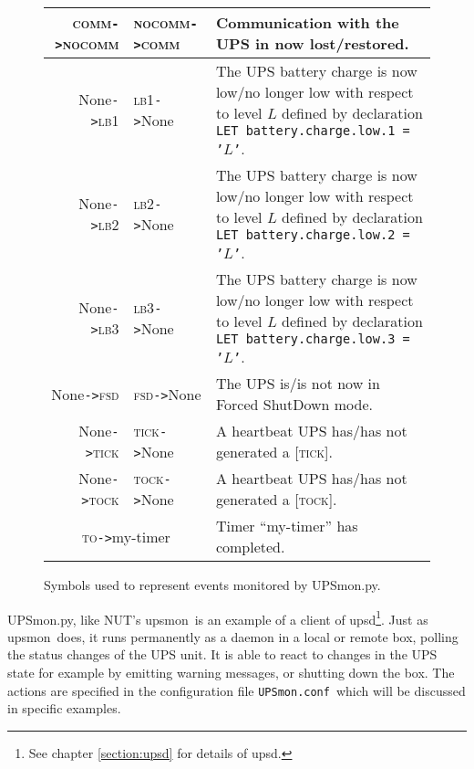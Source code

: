 \documentclass[12pt]{article}
\newcommand{\upsd}{\mbox{\textcolor{UPSDCOLOUR}{upsd}}}
\newcommand{\upsmon}{\mbox{\textcolor{MONCOLOUR}{upsmon}}}
\newcommand{\UPSmon}{\mbox{\textcolor{UPSMONCOLOUR}{UPSmon.py}}}
\newcommand{\LBi}{\textcolor{MONCOLOUR}{\textsc{lb1}}}
\newcommand{\LBii}{\textcolor{MONCOLOUR}{\textsc{lb2}}}
\newcommand{\LBiii}{\textcolor{MONCOLOUR}{\textsc{lb3}}}
\newcommand{\NOCOMM}{\textcolor{MONCOLOUR}{\textsc{nocomm}}}
\newcommand{\FSD}{\textcolor{UPSMONCOLOUR}{\textsc{fsd}}}
\newcommand{\COMM}{\textcolor{UPSMONCOLOUR}{\textsc{comm}}}
\newcommand{\None}{\textcolor{UPSMONCOLOUR}{\textsf{None}}}
\newcommand{\TICK}{\textcolor{UPSMONCOLOUR}{\textsc{tick}}}
\newcommand{\TO}{\textcolor{UPSMONCOLOUR}{\textsc{to}}}
\newcommand{\TOCK}{\textcolor{UPSMONCOLOUR}{\textsc{tock}}}
\newcommand{\status}[1]{\textcolor{UPSDCOLOUR}{[{#1}]}}
\newcommand{\EVENT}[2]{\textcolor{MONCOLOUR}{#1}{\allowbreak}\texttt{\textcolor{MONCOLOUR}{->}}{\allowbreak}\textcolor{MONCOLOUR}{#2}}
\newcommand{\UPSmonconf}{\textcolor{UPSMONCOLOUR}{\texttt{UPSmon.conf}}}
\begin{document}
\begin{figure}[ht]
\begin{center}
\begin{tabular}{|r|l|p{0.65\LinePrinterwidth}|}
\EVENT{\COMM}{\NOCOMM}  & \EVENT{\NOCOMM}{\COMM}   & Communication with the UPS in now lost/restored. \\ \hline
\EVENT{\None}{\LBi}     & \EVENT{\LBi}{\None}      & The UPS battery charge is now low/no longer 
                                                     low with respect to level $L$ defined by declaration
                                                     \texttt{LET battery.charge.low.1 = '}$L$\texttt{'}. \\ \hline
\EVENT{\None}{\LBii}    & \EVENT{\LBii}{\None}     & The UPS battery charge is now low/no longer 
                                                     low with respect to level $L$ defined by declaration
                                                     \texttt{LET battery.charge.low.2 = '}$L$\texttt{'}. \\ \hline
\EVENT{\None}{\LBiii}   & \EVENT{\LBiii}{\None}    & The UPS battery charge is now low/no longer
                                                     low with respect to level $L$ defined by declaration
                                                     \texttt{LET battery.charge.low.3 = '}$L$\texttt{'}. \\ \hline
\EVENT{\None}{\FSD}     & \EVENT{\FSD}{\None}      & The UPS is/is not now in Forced ShutDown mode. \\ \hline
\EVENT{\None}{\TICK}    & \EVENT{\TICK}{\None}     & A heartbeat UPS has/has not generated a \status{\TICK}. \\ \hline
\EVENT{\None}{\TOCK}    & \EVENT{\TOCK}{\None}     & A heartbeat UPS has/has not generated a \status{\TOCK}. \\ \hline
\multicolumn{2}{|c|}{\EVENT{\TO}{my-timer}}        & Timer ``my-timer'' has completed. \\ \hline
\end{tabular}
\caption{Symbols used to represent events monitored by \UPSmon.\label{fig:UPSmonEVENT}}
\end{center}
\end{figure}

\UPSmon, like NUT's \upsmon\ is an example of a client of \upsd\footnote{See
  chapter \ref{section:upsd} for details of \upsd.}.  Just as \upsmon\ does,
it runs permanently as a daemon in a local or remote box, polling the status
changes of the UPS unit.  It is able to react to changes in the UPS state for
example by emitting warning messages, or shutting down the box.  The actions
are specified in the configuration file \UPSmonconf\ which will be discussed
in specific examples.
\end{document}

